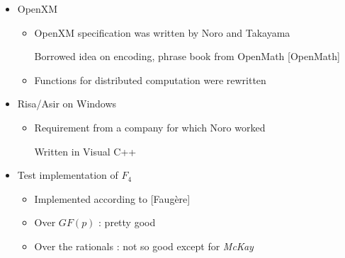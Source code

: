 \begin{slide}{}
\begin{itemize}
\item OpenXM

\begin{itemize}
\item OpenXM specification was written by Noro and Takayama

Borrowed idea on encoding, phrase book from OpenMath [OpenMath]

\item Functions for distributed computation were rewritten
\end{itemize}

\item Risa/Asir on Windows

\begin{itemize}
\item Requirement from a company for which Noro worked

Written in Visual C++
\end{itemize}

\item Test implementation of $F_4$

\begin{itemize}
\item Implemented according to [Faug\`ere]

\item Over $GF(p)$ : pretty good

\item Over the rationals : not so good except for {\it McKay}
\end{itemize}
\end{itemize}
\end{slide}


